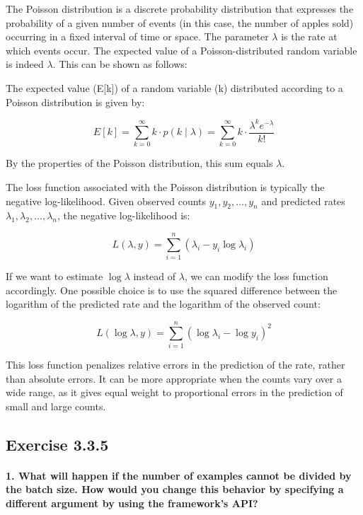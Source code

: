 The Poisson distribution is a discrete probability distribution that expresses the probability of a given number of events (in this case, the number of apples sold) occurring in a fixed interval of time or space.
The parameter \(\lambda\) is the rate at which events occur.
The expected value of a Poisson-distributed random variable is indeed \(\lambda\). This can be shown as follows:

The expected value (E[k]) of a random variable (k) distributed according to a Poisson distribution is given by:

\[E[k] = \sum_{k=0}^{\infty} k \cdot p(k \mid \lambda) = \sum_{k=0}^{\infty} k \cdot \frac{\lambda^k e^{-\lambda}}{k!}\]

By the properties of the Poisson distribution, this sum equals \(\lambda\).

The loss function associated with the Poisson distribution is typically the negative log-likelihood. Given observed counts \(y_1, y_2, \ldots, y_n\) and predicted rates \(\lambda_1, \lambda_2, \ldots, \lambda_n\), the negative log-likelihood is:

\[L(\lambda, y) = \sum_{i=1}^{n} \left(\lambda_i - y_i \log \lambda_i\right)\]

If we want to estimate \(\log \lambda\) instead of \(\lambda\), we can modify the loss function accordingly.
One possible choice is to use the squared difference between the logarithm of the predicted rate and the logarithm of the observed count:

\[L\left(\log \lambda, y\right) = \sum_{i=1}^{n} \left(\log \lambda_i - \log y_i\right)^2\]

This loss function penalizes relative errors in the prediction of the rate, rather than absolute errors. It can be more appropriate when the counts vary over a wide range, as it gives equal weight to proportional errors in the prediction of small and large counts.

\subsection{Exercise 3.3.5}

\paragraph{1. What will happen if the number of examples cannot be divided by the batch size. How would you change this behavior by specifying a different argument by using the framework’s API?}

